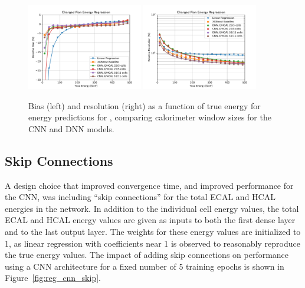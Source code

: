 \begin{figure}[htbp]
\centering
\includegraphics[width=0.45\textwidth]{Images/Calo/bias_vs_E_ChPiFixed_Cut30_nn_numcells.pdf}
\includegraphics[width=0.45\textwidth]{Images/Calo/res_vs_E_ChPiFixed_Cut30_nn_numcells_fits.pdf}
\caption{Bias (left) and resolution (right) as a function of true energy for energy predictions for \chpi, comparing calorimeter window sizes for the CNN and DNN models.
}
\label{fig:reg_nn_numcells_chpi_large_window}
\end{figure}

\subsection*{Skip Connections}

A design choice that improved convergence time, and improved performance for the CNN, was including ``skip connections'' for the total ECAL and HCAL energies in the network.  In addition to the individual cell energy values, the total ECAL and HCAL energy values are given as inputs to both the first dense layer and to the last output layer.  The weights for these energy values are initialized to 1, as linear regression with coefficients near 1 is observed to reasonably reproduce the true energy values.  The impact of adding skip connections on performance using a CNN architecture for a fixed number of 5 training epochs is shown in Figure~\ref{fig:reg_cnn_skip}.

